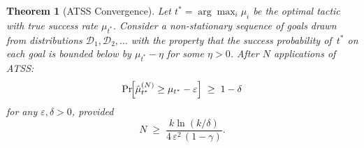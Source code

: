 \documentclass[conference]{IEEEtran}
\newtheorem{theorem}{Theorem}[section]
\newcommand{\ATSS}{\textsc{ATSS}}
\begin{document}
\begin{theorem}[ATSS Convergence]
  \label{thm:atss-convergence}
  Let $t^* = \arg\max_i \mu_i$ be the optimal tactic with true
  success rate $\mu_{t^*}$.  Consider a \emph{non-stationary} sequence
  of goals drawn from distributions
  $\mathcal{D}_1, \mathcal{D}_2, \ldots$ with the property that
  the success probability of~$t^*$ on each goal is bounded below by
  $\mu_{t^*} - \eta$ for some $\eta > 0$.  After $N$ applications
  of \ATSS{}:
  \begin{equation}
    \Pr\!\Bigl[\hat{\mu}_{t^*}^{(N)} \geq \mu_{t^*}
      - \varepsilon\Bigr]
    \;\geq\; 1 - \delta
  \end{equation}
  for any $\varepsilon, \delta > 0$, provided
  \begin{equation}
    N \;\geq\; \frac{k \ln(k/\delta)}{4\,\varepsilon^{2}\,(1-\gamma)}.
    \label{eq:sample-bound}
  \end{equation}
\end{theorem}
\end{document}
